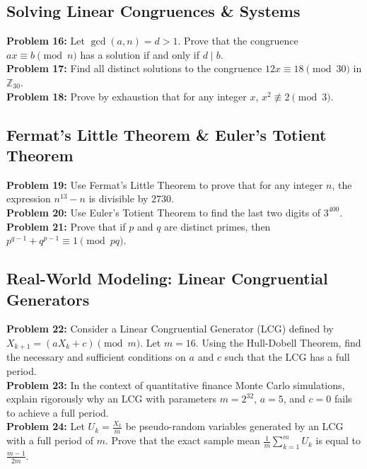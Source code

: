 \documentclass[11pt, a4paper]{article}
\theoremstyle{definition}
\theoremstyle{remark}
\newcommand{\Z}{\mathbb{Z}}
\begin{document}
\subsection{Solving Linear Congruences \& Systems}
\textbf{Problem 16:} Let $\gcd(a,n) = d > 1$. Prove that the congruence $ax \equiv b \pmod n$ has a solution if and only if $d \mid b$. \\
\textbf{Problem 17:} Find all distinct solutions to the congruence $12x \equiv 18 \pmod{30}$ in $\Z_{30}$. \\
\textbf{Problem 18:} Prove by exhaustion that for any integer $x$, $x^2 \not\equiv 2 \pmod 3$.

\subsection{Fermat's Little Theorem \& Euler's Totient Theorem}
\textbf{Problem 19:} Use Fermat's Little Theorem to prove that for any integer $n$, the expression $n^{13} - n$ is divisible by $2730$. \\
\textbf{Problem 20:} Use Euler's Totient Theorem to find the last two digits of $3^{400}$. \\
\textbf{Problem 21:} Prove that if $p$ and $q$ are distinct primes, then $p^{q-1} + q^{p-1} \equiv 1 \pmod{pq}$.

\subsection{Real-World Modeling: Linear Congruential Generators}
\textbf{Problem 22:} Consider a Linear Congruential Generator (LCG) defined by $X_{k+1} = (aX_k + c) \pmod m$. Let $m = 16$. Using the Hull-Dobell Theorem, find the necessary and sufficient conditions on $a$ and $c$ such that the LCG has a full period. \\
\textbf{Problem 23:} In the context of quantitative finance Monte Carlo simulations, explain rigorously why an LCG with parameters $m=2^{32}$, $a=5$, and $c=0$ fails to achieve a full period. \\
\textbf{Problem 24:} Let $U_k = \frac{X_k}{m}$ be pseudo-random variables generated by an LCG with a full period of $m$. Prove that the exact sample mean $\frac{1}{m} \sum_{k=1}^m U_k$ is equal to $\frac{m-1}{2m}$.
\end{document}
